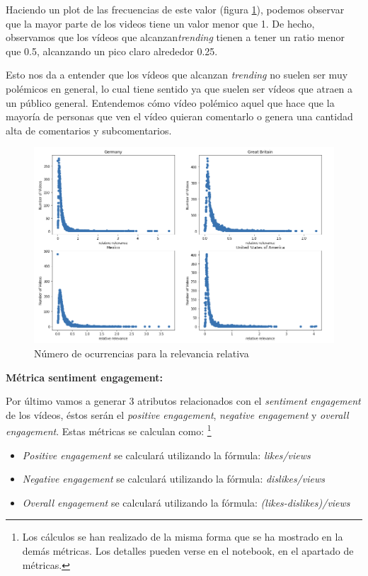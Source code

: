 \documentclass[a4paper,12pt]{article}
\begin{document}
Haciendo un plot de las frecuencias de este valor (figura \ref{fig:relfig}), podemos observar que la mayor parte de los videos tiene un valor menor que  1.  De hecho, observamos que los v\'ideos que alcanzan{\itshape trending} tienen a tener un ratio menor que 0.5, alcanzando un pico claro alrededor 0.25.

Esto nos da a entender que los v\'ideos que alcanzan {\itshape trending} no suelen ser muy pol\'emicos en general, lo cual tiene sentido ya que suelen ser v\'ideos que atraen a un p\'ublico general. Entendemos c\'omo v\'ideo pol\'emico aquel que hace que la mayor\'ia de personas que ven el v\'ideo quieran comentarlo o genera una cantidad alta de comentarios y subcomentarios.

\begin{figure}[h!]
\centering
\includegraphics[width=14cm]{rel_relevance_plot.png}
\caption{N\'umero de ocurrencias para la relevancia relativa}
\label{fig:relfig}

\end{figure}

\textbf{M\'etrica sentiment engagement:}

Por \'ultimo vamos a generar 3 atributos relacionados con el {\itshape sentiment engagement} de los v\'ideos, \'estos ser\'an el {\itshape positive engagement}, {\itshape negative engagement} y {\itshape overall engagement}.
\newpage
Estas m\'etricas se calculan como: \footnote{Los c\'alculos se han realizado de la misma forma que se ha mostrado en la dem\'as m\'etricas. Los detalles pueden verse en el notebook, en el apartado de m\'etricas.}

\begin{itemize}
\item {\itshape Positive engagement} se calcular\'a utilizando la f\'ormula: {\itshape likes/views}


\item {\itshape Negative engagement} se calcular\'a utilizando la f\'ormula: {\itshape dislikes/views}


\item {\itshape Overall engagement} se calcular\'a utilizando la f\'ormula: {\itshape (likes-dislikes)/views}

\end{itemize}
\end{document}
